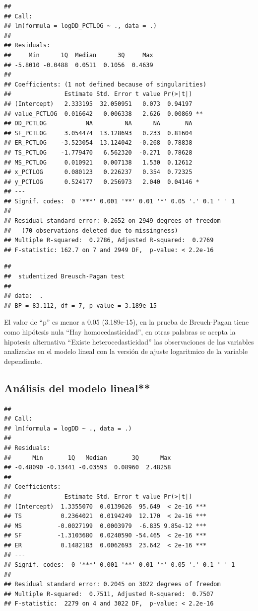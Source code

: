 \documentclass[11pt,]{article}
\begin{document}
\begin{verbatim}
## 
## Call:
## lm(formula = logDD_PCTLOG ~ ., data = .)
## 
## Residuals:
##     Min      1Q  Median      3Q     Max 
## -5.8010 -0.0488  0.0511  0.1056  0.4639 
## 
## Coefficients: (1 not defined because of singularities)
##               Estimate Std. Error t value Pr(>|t|)   
## (Intercept)   2.333195  32.050951   0.073  0.94197   
## value_PCTLOG  0.016642   0.006338   2.626  0.00869 **
## DD_PCTLOG           NA         NA      NA       NA   
## SF_PCTLOG     3.054474  13.128693   0.233  0.81604   
## ER_PCTLOG    -3.523054  13.124042  -0.268  0.78838   
## TS_PCTLOG    -1.779470   6.562320  -0.271  0.78628   
## MS_PCTLOG     0.010921   0.007138   1.530  0.12612   
## x_PCTLOG      0.080123   0.226237   0.354  0.72325   
## y_PCTLOG      0.524177   0.256973   2.040  0.04146 * 
## ---
## Signif. codes:  0 '***' 0.001 '**' 0.01 '*' 0.05 '.' 0.1 ' ' 1
## 
## Residual standard error: 0.2652 on 2949 degrees of freedom
##   (70 observations deleted due to missingness)
## Multiple R-squared:  0.2786, Adjusted R-squared:  0.2769 
## F-statistic: 162.7 on 7 and 2949 DF,  p-value: < 2.2e-16
\end{verbatim}

\begin{verbatim}
## 
##  studentized Breusch-Pagan test
## 
## data:  .
## BP = 83.112, df = 7, p-value = 3.189e-15
\end{verbatim}

El valor de ``p'' es menor a 0.05 (3.189e-15), en la prueba de
Breuch-Pagan tiene como hipótesis nula ``Hay homocedasticidad'', en
otras palabras se acepta la hipotesis alternativa ``Existe
heterocedasticidad'' las observaciones de las variables analizadas en el
modelo lineal con la versión de ajuste logaritmico de la variable
dependiente.

\subsection{Análisis del modelo
lineal**}\label{anuxe1lisis-del-modelo-lineal}

\begin{verbatim}
## 
## Call:
## lm(formula = logDD ~ ., data = .)
## 
## Residuals:
##      Min       1Q   Median       3Q      Max 
## -0.48090 -0.13441 -0.03593  0.08960  2.48258 
## 
## Coefficients:
##               Estimate Std. Error t value Pr(>|t|)    
## (Intercept)  1.3355070  0.0139626  95.649  < 2e-16 ***
## TS           0.2364021  0.0194249  12.170  < 2e-16 ***
## MS          -0.0027199  0.0003979  -6.835 9.85e-12 ***
## SF          -1.3103680  0.0240590 -54.465  < 2e-16 ***
## ER           0.1482183  0.0062693  23.642  < 2e-16 ***
## ---
## Signif. codes:  0 '***' 0.001 '**' 0.01 '*' 0.05 '.' 0.1 ' ' 1
## 
## Residual standard error: 0.2045 on 3022 degrees of freedom
## Multiple R-squared:  0.7511, Adjusted R-squared:  0.7507 
## F-statistic:  2279 on 4 and 3022 DF,  p-value: < 2.2e-16
\end{verbatim}
\end{document}
